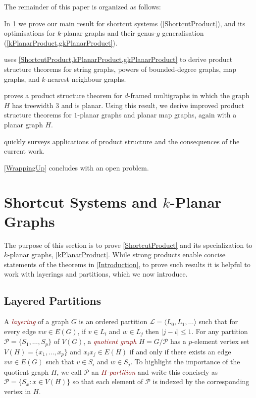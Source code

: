 \documentclass{patmorin}
\theoremstyle{plain}
\theoremstyle{definition}
\newcommand{\defin}[1]{\textcolor{Maroon}{\emph{#1}}}
\newcommand{\note}[2]{\noindent{\color{red}[#1:~#2]}}
\newcommand{\PP}{\mathcal{P}}
\renewcommand{\leq}{\leqslant}
\begin{document}
The remainder of this paper is organized as follows:
\begin{compactitem}
  \item In \cref{Structure} we prove our main result for shortcut systems (\cref{ShortcutProduct}), and its optimisations for $k$-planar graphs and their genus-$g$ generalisation (\cref{kPlanarProduct,gkPlanarProduct}).
  \item {} uses \cref{ShortcutProduct,kPlanarProduct,gkPlanarProduct} to derive product structure theorems for string graphs, powers of bounded-degree graphs, map graphs, and $k$-nearest neighbour graphs.
  \item {} proves a product structure theorem for $d$-framed multigraphs in which the graph $H$ has treewidth $3$ and is planar.  Using this result, we derive improved product structure theorems for $1$-planar graphs and planar map graphs, again with a planar graph $H$.
  \item {} quickly surveys applications of product structure and the consequences of the current work.
  \item \cref{WrappingUp} concludes with an open problem.
\end{compactitem}




\section{\boldmath Shortcut Systems and $k$-Planar Graphs}
\label{Structure}

The purpose of this section is to prove \cref{ShortcutProduct} and its specialization to $k$-planar graphs, \cref{kPlanarProduct}.
While strong products enable concise statements of the theorems in \cref{Introduction}, to prove such results it is helpful to work with layerings and partitions, which we now introduce.

\subsection{Layered Partitions}

A \defin{layering} of a graph $G$
is an ordered partition $\mathcal{L}=\langle L_0,L_1,\ldots\rangle $ such that for every edge
$vw\in E(G)$, if $v\in L_i$ and $w\in L_j$ then $|j-i|\leq 1$.  For any partition $\PP=\{S_1,\ldots,S_p\}$ of $V(G)$, a \defin{quotient graph} $H=G/\PP$ has a $p$-element vertex set $V(H)=\{x_1,\ldots,x_p\}$ and $x_ix_j\in E(H)$ if and only if there exists an edge $vw\in E(G)$ such that $v\in S_i$ and $w\in S_j$. To highlight the importance of the quotient graph $H$, we call $\PP$ an \defin{$H$-partition} and write this concisely as $\PP=\{S_x : x\in V(H)\}$ so that each element of $\PP$ is indexed by the corresponding vertex in $H$.
\end{document}

